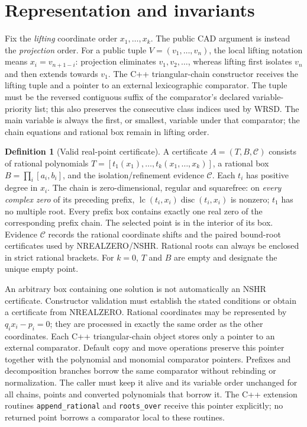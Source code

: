 \documentclass[11pt]{article}
\theoremstyle{definition}
\newtheorem{definition}[theorem]{Definition}
\newcommand{\lc}{\operatorname{lc}}
\newcommand{\disc}{\operatorname{disc}}
\begin{document}
\section{Representation and invariants}
Fix the \emph{lifting} coordinate order $x_1,\ldots,x_k$.
The public CAD argument is instead the \emph{projection} order. For a public
tuple $V=(v_1,\ldots,v_n)$, the local lifting notation means
$x_i=v_{n+1-i}$: projection eliminates $v_1,v_2,\ldots$, whereas lifting
first isolates $v_n$ and then extends towards $v_1$.
The C++ triangular-chain constructor receives the lifting tuple and a pointer
to an external lexicographic comparator. The tuple must be the reversed
contiguous suffix of the comparator's declared variable-priority list;
this also preserves the consecutive class indices used by WRSD. The main variable is
always the first, or smallest, variable under that comparator; the chain
equations and rational box remain in lifting order.
\begin{definition}[Valid real-point certificate]
A certificate $A=(T,B,\mathcal C)$ consists of rational polynomials
$T=[t_1(x_1),\ldots,t_k(x_1,\ldots,x_k)]$, a rational box
$B=\prod_i[a_i,b_i]$, and the isolation/refinement evidence $\mathcal C$.
Each $t_i$ has positive degree in $x_i$. The chain is zero-dimensional,
regular and squarefree: on \emph{every complex zero} of its preceding prefix,
$\lc(t_i,x_i)\disc(t_i,x_i)$ is nonzero; $t_1$ has no multiple root.
Every prefix box contains exactly one real zero of the corresponding prefix chain.
The selected point is in the interior of its box. Evidence $\mathcal C$ records
the rational coordinate shifts and the paired bound-root certificates used by
NREALZERO/NSHR. Rational roots can always be enclosed in strict rational brackets.
For $k=0$, $T$ and $B$ are empty and designate the unique empty point.
\end{definition}
An arbitrary box containing one solution is not automatically an NSHR certificate.
Constructor validation must establish the stated conditions or obtain a certificate
from NREALZERO. Rational coordinates may be represented by $q_i x_i-p_i=0$;
they are processed in exactly the same order as the other coordinates.
Each C++ triangular-chain object stores only a pointer to an external comparator.
Default copy and move operations preserve this pointer together with the
polynomial and monomial comparator pointers. Prefixes and decomposition branches
borrow the same comparator without rebinding or normalization. The caller must
keep it alive and its variable order unchanged for all chains, points and
converted polynomials that borrow it. The C++ extension routines
\texttt{append\_rational} and \texttt{roots\_over} receive this pointer
explicitly; no returned point borrows a comparator local to these routines.
\end{document}
